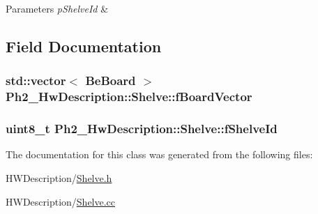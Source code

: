 \begin{DoxyParams}{Parameters}
{\em p\-Shelve\-Id} & \\
\hline
\end{DoxyParams}


\subsection{Field Documentation}
\hypertarget{class_ph2___hw_description_1_1_shelve_a5b87ee50bb6046acadaeb8226395da52}{
\subsubsection[{f\-Board\-Vector}]{\setlength{\rightskip}{0pt plus 5cm}std\-::vector$<$ {\bf Be\-Board} $>$ Ph2\-\_\-\-Hw\-Description\-::\-Shelve\-::f\-Board\-Vector\hspace{0.3cm}{\ttfamily [protected]}}}\label{class_ph2___hw_description_1_1_shelve_a5b87ee50bb6046acadaeb8226395da52}
\hypertarget{class_ph2___hw_description_1_1_shelve_ad6a771be1946db28ff6418ac419ef543}{
\subsubsection[{f\-Shelve\-Id}]{\setlength{\rightskip}{0pt plus 5cm}uint8\-\_\-t Ph2\-\_\-\-Hw\-Description\-::\-Shelve\-::f\-Shelve\-Id\hspace{0.3cm}{\ttfamily [protected]}}}\label{class_ph2___hw_description_1_1_shelve_ad6a771be1946db28ff6418ac419ef543}


The documentation for this class was generated from the following files\-:\begin{DoxyCompactItemize}
\item 
H\-W\-Description/\hyperlink{_shelve_8h}{Shelve.\-h}\item 
H\-W\-Description/\hyperlink{_shelve_8cc}{Shelve.\-cc}\end{DoxyCompactItemize}
